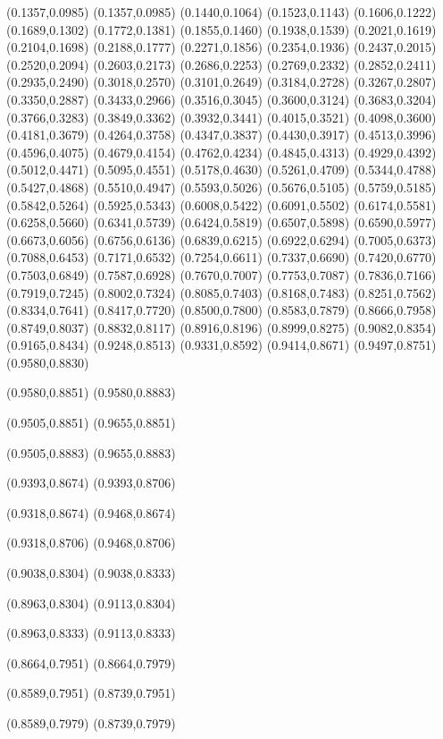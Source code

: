\PST@Solid(0.1357,0.0985)
(0.1357,0.0985)
(0.1440,0.1064)
(0.1523,0.1143)
(0.1606,0.1222)
(0.1689,0.1302)
(0.1772,0.1381)
(0.1855,0.1460)
(0.1938,0.1539)
(0.2021,0.1619)
(0.2104,0.1698)
(0.2188,0.1777)
(0.2271,0.1856)
(0.2354,0.1936)
(0.2437,0.2015)
(0.2520,0.2094)
(0.2603,0.2173)
(0.2686,0.2253)
(0.2769,0.2332)
(0.2852,0.2411)
(0.2935,0.2490)
(0.3018,0.2570)
(0.3101,0.2649)
(0.3184,0.2728)
(0.3267,0.2807)
(0.3350,0.2887)
(0.3433,0.2966)
(0.3516,0.3045)
(0.3600,0.3124)
(0.3683,0.3204)
(0.3766,0.3283)
(0.3849,0.3362)
(0.3932,0.3441)
(0.4015,0.3521)
(0.4098,0.3600)
(0.4181,0.3679)
(0.4264,0.3758)
(0.4347,0.3837)
(0.4430,0.3917)
(0.4513,0.3996)
(0.4596,0.4075)
(0.4679,0.4154)
(0.4762,0.4234)
(0.4845,0.4313)
(0.4929,0.4392)
(0.5012,0.4471)
(0.5095,0.4551)
(0.5178,0.4630)
(0.5261,0.4709)
(0.5344,0.4788)
(0.5427,0.4868)
(0.5510,0.4947)
(0.5593,0.5026)
(0.5676,0.5105)
(0.5759,0.5185)
(0.5842,0.5264)
(0.5925,0.5343)
(0.6008,0.5422)
(0.6091,0.5502)
(0.6174,0.5581)
(0.6258,0.5660)
(0.6341,0.5739)
(0.6424,0.5819)
(0.6507,0.5898)
(0.6590,0.5977)
(0.6673,0.6056)
(0.6756,0.6136)
(0.6839,0.6215)
(0.6922,0.6294)
(0.7005,0.6373)
(0.7088,0.6453)
(0.7171,0.6532)
(0.7254,0.6611)
(0.7337,0.6690)
(0.7420,0.6770)
(0.7503,0.6849)
(0.7587,0.6928)
(0.7670,0.7007)
(0.7753,0.7087)
(0.7836,0.7166)
(0.7919,0.7245)
(0.8002,0.7324)
(0.8085,0.7403)
(0.8168,0.7483)
(0.8251,0.7562)
(0.8334,0.7641)
(0.8417,0.7720)
(0.8500,0.7800)
(0.8583,0.7879)
(0.8666,0.7958)
(0.8749,0.8037)
(0.8832,0.8117)
(0.8916,0.8196)
(0.8999,0.8275)
(0.9082,0.8354)
(0.9165,0.8434)
(0.9248,0.8513)
(0.9331,0.8592)
(0.9414,0.8671)
(0.9497,0.8751)
(0.9580,0.8830)

\PST@Dashed(0.9580,0.8851)
(0.9580,0.8883)

\PST@Dashed(0.9505,0.8851)
(0.9655,0.8851)

\PST@Dashed(0.9505,0.8883)
(0.9655,0.8883)

\PST@Dashed(0.9393,0.8674)
(0.9393,0.8706)

\PST@Dashed(0.9318,0.8674)
(0.9468,0.8674)

\PST@Dashed(0.9318,0.8706)
(0.9468,0.8706)

\PST@Dashed(0.9038,0.8304)
(0.9038,0.8333)

\PST@Dashed(0.8963,0.8304)
(0.9113,0.8304)

\PST@Dashed(0.8963,0.8333)
(0.9113,0.8333)

\PST@Dashed(0.8664,0.7951)
(0.8664,0.7979)

\PST@Dashed(0.8589,0.7951)
(0.8739,0.7951)

\PST@Dashed(0.8589,0.7979)
(0.8739,0.7979)

